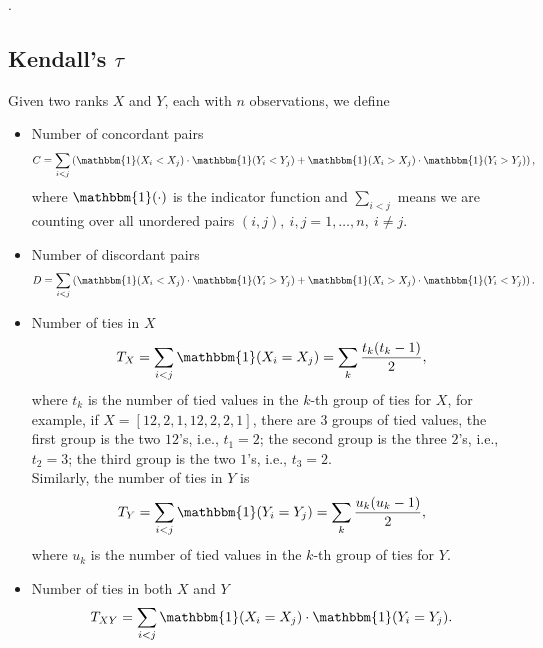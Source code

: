 .



\subsection{Kendall's $\tau$}
\label{sec:kendalltau}

Given two ranks $X$ and $Y$, each with $n$ observations, we define
\begin{itemize}
\item Number of concordant pairs 
      \begin{equation*}
      C = \sum_{i < j} \left( \mathbbm{1}(X_i < X_j) \cdot \mathbbm{1}(Y_i < Y_j) + \mathbbm{1}(X_i > X_j) \cdot \mathbbm{1}(Y_i > Y_j) \right),
      \end{equation*}
      where $\mathbbm{1}(\cdot)$ is the indicator function and 
      $\sum_{i < j}$ means we are counting over all unordered pairs $(i, j),~ i,j=1,\dots,n,~ i \ne j$.

\item Number of discordant pairs 
      \begin{equation*}
      D = \sum_{i < j} \left( \mathbbm{1}(X_i < X_j) \cdot \mathbbm{1}(Y_i > Y_j) + \mathbbm{1}(X_i > X_j) \cdot \mathbbm{1}(Y_i < Y_j) \right).
      \end{equation*}

\item Number of ties in $X$
      \begin{equation*}
      T_X = \sum_{i < j} \mathbbm{1}(X_i = X_j) = \sum_k \frac{t_k (t_k - 1)}{2},
      \end{equation*}
      where $t_k$ is the number of tied values in the $k$-th group of ties for $X$, for example, if
      $X = [12, 2, 1, 12, 2, 2, 1]$, there are $3$ groups of tied values, the first group is the two $12$'s, i.e., $t_1 = 2$;
      the second group is the three $2$'s, i.e., $t_2 = 3$; the third group is the two $1$'s, i.e., $t_3 = 2$. \\
      Similarly, the number of ties in $Y$ is 
      \begin{equation*}
      T_Y = \sum_{i < j} \mathbbm{1}(Y_i = Y_j) = \sum_k \frac{u_k (u_k - 1)}{2},
      \end{equation*}
      where $u_k$ is the number of tied values in the $k$-th group of ties for $Y$.

\item Number of ties in both $X$ and $Y$
      \begin{equation*}
      T_{XY} = \sum_{i < j} \mathbbm{1}(X_i = X_j) \cdot \mathbbm{1}(Y_i = Y_j).
      \end{equation*}


\end{itemize}
